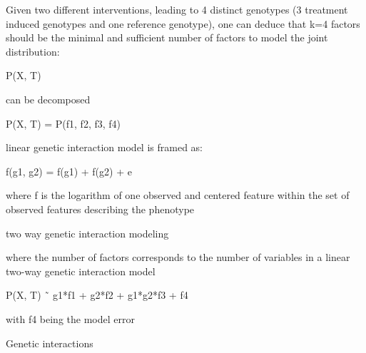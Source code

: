 \begin{flushleft}
Given two different interventions, leading to 4 distinct genotypes (3 treatment induced genotypes and one reference genotype), one can deduce that k=4 factors should be the minimal and sufficient number of factors to model the joint distribution: 

P(X, T) 

can be decomposed

P(X, T) = P(f1, f2, f3, f4) 

linear genetic interaction model is framed as: 

f(g1, g2) = f(g1) + f(g2) + e

where f is the logarithm of one observed and centered feature within the set of observed features describing the phenotype

two way genetic interaction modeling 

where the number of factors corresponds to the number of variables in a linear two-way genetic interaction model

P(X, T) ˜ g1*f1 + g2*f2 + g1*g2*f3 + f4

with f4 being the model error

Genetic interactions



\end{flushleft}